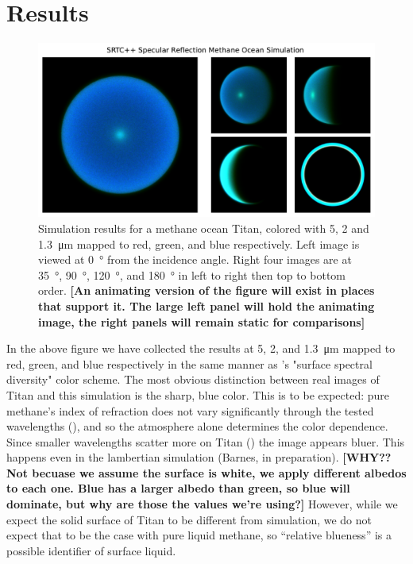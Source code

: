 \documentclass{article}
\begin{document}
\section{Results}

\begin{figure}[htb]
\includegraphics[scale = 0.5]{SpecularSim.pdf}
\centering
\caption{Simulation results for a methane ocean Titan, colored with 5, 2 and \qty{1.3}{\micro\meter} mapped to red, green, and blue respectively. Left image is viewed at \qty{0}{\degree} from the incidence angle. Right four images are at  \qty{35}{\degree},  \qty{90}{\degree},  \qty{120}{\degree}, and  \qty{180}{\degree} in left to right then top to bottom order. \textbf{\color{red} [An animating version of the figure will exist in places that support it. The large left panel will hold the animating image, the right  panels will remain static for comparisons] \color{black}}}
\label{fig:6}
\end{figure}

In the above figure we have collected the results at 5, 2, and \qty{1.3}{\micro\meter} mapped to red, green, and blue respectively in the same manner as \cite{Barnes2018}'s "surface spectral diversity" color scheme. The most obvious distinction between real images of Titan and this simulation is the sharp, blue color. This is to be expected: pure methane's index of refraction does not vary significantly through the tested wavelengths (\cite{Martonchik1994}), and so the atmosphere alone determines the color dependence. Since smaller wavelengths scatter more on Titan (\cite{EsSayeh2023}) the image appears bluer. This happens even in the lambertian simulation (Barnes, in preparation). \textbf{\color{red} [WHY?? Not becuase we assume the surface is white, we apply different albedos to each one. Blue has a larger albedo than green, so blue will dominate, but why are those the values we're using?] \color{black}} However, while we expect the solid surface of Titan to be different from simulation, we do not expect that to be the case with pure liquid methane, so ``relative blueness'' is a possible identifier of surface liquid. 
\end{document}

